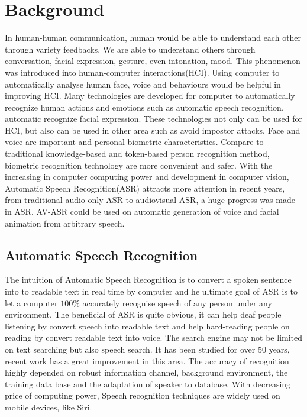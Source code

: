 \chapter{Background}
In human-human communication, human would be able to understand each other through variety feedbacks. We are able to understand others through conversation, facial expression, gesture, even intonation, mood. This phenomenon was introduced into human-computer interactions(HCI). Using computer to automatically analyse human face, voice and behaviours would be helpful in improving HCI. Many technologies are developed for computer to automatically recognize human actions and emotions such as automatic speech recognition\cite{potamianos2003recent}, automatic recognize facial expression\cite{xiong2013supervised}. These technologies not only can be used for HCI, but also can be used in other area such as avoid impostor attacks\cite{aleksic2006audio}. Face and voice are important and personal biometric characteristics. Compare to traditional knowledge-based and token-based person recognition method, biometric recognition technology are more convenient and safer. With the increasing in computer computing power and development in computer vision, Automatic Speech Recognition(ASR) attracts more attention in recent years, from traditional audio-only ASR to audiovisual ASR, a huge progress was made in ASR. AV-ASR could be used on automatic generation of voice and facial animation from arbitrary speech.

\section{Automatic Speech Recognition}
The intuition of Automatic Speech Recognition is to convert a spoken sentence into to readable text in real time by computer and he ultimate goal of ASR is to let a computer $100\%$ accurately recognise speech of any person under any environment. The beneficial of ASR is quite obvious, it can help deaf people listening by convert speech into readable text and help hard-reading people on reading by convert readable text into voice. The search engine may not be limited on text searching but also speech search. It has been studied for over 50 years, recent work has a great improvement in this area. The accuracy of recognition highly depended on robust information channel, background environment, the training data base and the adaptation of speaker to database. With decreasing price of computing power, Speech recognition techniques are widely used on mobile devices, like Siri.

